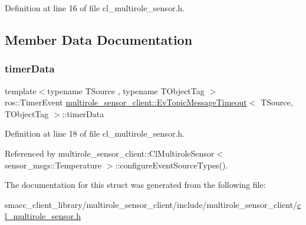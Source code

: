 Definition at line 16 of file cl\+\_\+multirole\+\_\+sensor.\+h.



\subsection{Member Data Documentation}
\mbox{\label{structmultirole__sensor__client_1_1EvTopicMessageTimeout_acf6851104497bd60ac389051f5b4f2b0}} 
\subsubsection{\texorpdfstring{timer\+Data}{timerData}}
{\footnotesize\ttfamily template$<$typename T\+Source , typename T\+Object\+Tag $>$ \\
ros\+::\+Timer\+Event \hyperlink{structmultirole__sensor__client_1_1EvTopicMessageTimeout}{multirole\+\_\+sensor\+\_\+client\+::\+Ev\+Topic\+Message\+Timeout}$<$ T\+Source, T\+Object\+Tag $>$\+::timer\+Data}



Definition at line 18 of file cl\+\_\+multirole\+\_\+sensor.\+h.



Referenced by multirole\+\_\+sensor\+\_\+client\+::\+Cl\+Multirole\+Sensor$<$ sensor\+\_\+msgs\+::\+Temperature $>$\+::configure\+Event\+Source\+Types().



The documentation for this struct was generated from the following file\+:\begin{DoxyCompactItemize}
\item 
smacc\+\_\+client\+\_\+library/multirole\+\_\+sensor\+\_\+client/include/multirole\+\_\+sensor\+\_\+client/\hyperlink{cl__multirole__sensor_8h}{cl\+\_\+multirole\+\_\+sensor.\+h}\end{DoxyCompactItemize}
